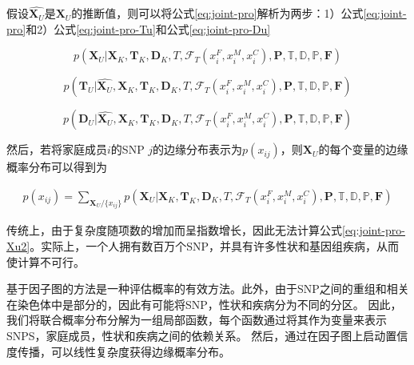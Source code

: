 假设$\hat{\mathbf{X}_U}$是$\mathbf{X}_U$的推断值，则可以将公式\ref{eq:joint-pro}解析为两步：1）公式\ref{eq:joint-pro}和2）公式\ref{eq:joint-pro-Tu}和公式\ref{eq:joint-pro-Du}

\begin{equation}\label{eq:joint-pro-Xu}
p(\mathbf{X}_U | \mathbf{X}_K, \mathbf{T}_K, \mathbf{D}_K, T, \mathcal{F}_T(x_i^F,x_i^M,x_i^C), \mathbf{P}, \mathbb{T}, \mathbb{D}, \mathbb{P}, \mathbf{F})
\end{equation}

\begin{equation}\label{eq:joint-pro-Tu}
p(\mathbf{T}_U |\hat{\mathbf{X}_U}, \mathbf{X}_K, \mathbf{T}_K, \mathbf{D}_K, T, \mathcal{F}_T(x_i^F,x_i^M,x_i^C), \mathbf{P}, \mathbb{T}, \mathbb{D}, \mathbb{P}, \mathbf{F})
\end{equation}

\begin{equation}\label{eq:joint-pro-Du}
p(\mathbf{D}_U |\hat{\mathbf{X}_U}, \mathbf{X}_K, \mathbf{T}_K, \mathbf{D}_K, T, \mathcal{F}_T(x_i^F,x_i^M,x_i^C), \mathbf{P}, \mathbb{T}, \mathbb{D}, \mathbb{P}, \mathbf{F})
\end{equation}


然后，若将家庭成员$i$的SNP $j$的边缘分布表示为$p(x_{ij})$，则$\mathbf{X}_U$的每个变量的边缘概率分布可以得到为

\begin{equation}\label{eq:joint-pro-Xu2}
\begin{aligned}
p(x_{ij})= \sum_{\mathbf{X}_U/\{x_{ij}\}} p(\mathbf{X}_U | \mathbf{X}_K, \mathbf{T}_K, \mathbf{D}_K, T,  \mathcal{F}_T(x_i^F,x_i^M,x_i^C), \mathbf{P}, \mathbb{T}, \mathbb{D}, \mathbb{P}, \mathbf{F})
\end{aligned}
\end{equation}


传统上，由于复杂度随项数的增加而呈指数增长，因此无法计算公式\ref{eq:joint-pro-Xu2}。实际上，一个人拥有数百万个SNP，并具有许多性状和基因组疾病，从而使计算不可行。


基于因子图的方法是一种评估概率\cite{kschischang2001factor}的有效方法。此外，由于SNP之间的重组和相关在染色体中是部分的，因此有可能将SNP，性状和疾病分为不同的分区。 因此，我们将联合概率分布分解为一组局部函数，每个函数通过将其作为变量来表示SNPS，家庭成员，性状和疾病之间的依赖关系。 然后，通过在因子图上启动置信度传播，可以线性复杂度获得边缘概率分布。


